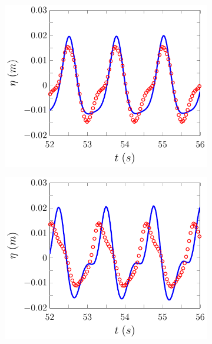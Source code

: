 \begin{figure}
	\centering
	\begin{subfigure}{0.5\textwidth}
		\includegraphics[width=\textwidth]{./chp6/figures/Experiment/Beji/sh/FEVMWG5.pdf}
		\vspace{0.5cm}
	\end{subfigure}%
	\begin{subfigure}{0.5\textwidth}
		\includegraphics[width=\textwidth]{./chp6/figures/Experiment/Beji/sh/FEVMWG6.pdf}
		\vspace{0.5cm}
	\end{subfigure}

\end{figure}
